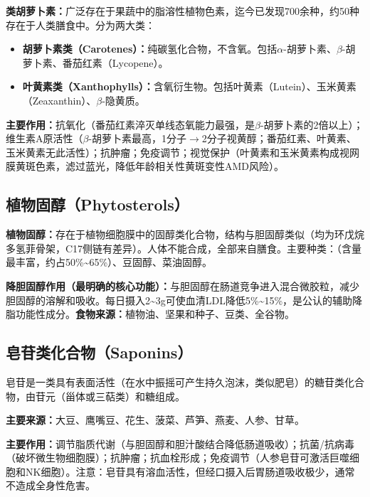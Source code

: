 \begin{tipbox}
\textbf{类胡萝卜素：}广泛存在于果蔬中的脂溶性植物色素，迄今已发现700余种，约50种存在于人类膳食中。分为两大类：
\begin{itemize}[leftmargin=*]
    \item \textbf{胡萝卜素类（Carotenes）：}纯碳氢化合物，不含氧。包括$\alpha$-胡萝卜素、$\beta$-胡萝卜素、番茄红素（Lycopene）。
    \item \textbf{叶黄素类（Xanthophylls）：}含氧衍生物。包括叶黄素（Lutein）、玉米黄素（Zeaxanthin）、$\beta$-隐黄质。
\end{itemize}

\textbf{主要作用：}抗氧化（番茄红素淬灭单线态氧能力最强，是$\beta$-胡萝卜素的2倍以上）；维生素A原活性（$\beta$-胡萝卜素最高，1分子$\rightarrow$2分子视黄醇；番茄红素、叶黄素、玉米黄素无此活性）；抗肿瘤；免疫调节；视觉保护（叶黄素和玉米黄素构成视网膜黄斑色素，滤过蓝光，降低年龄相关性黄斑变性AMD风险）。
\end{tipbox}

\subsection{植物固醇（Phytosterols）}

\begin{tipbox}
\textbf{植物固醇：}存在于植物细胞膜中的固醇类化合物，结构与胆固醇类似（均为环戊烷多氢菲骨架，C17侧链有差异）。人体不能合成，全部来自膳食。主要种类：（含量最丰富，约占50\%\~{}65\%）、豆固醇、菜油固醇。

\textbf{降胆固醇作用（最明确的核心功能）：}与胆固醇在肠道竞争进入混合微胶粒，减少胆固醇的溶解和吸收。每日摄入2\~{}3g可使血清LDL降低5\%\~{}15\%，是公认的辅助降脂功能性成分。\textbf{食物来源：}植物油、坚果和种子、豆类、全谷物。
\end{tipbox}

\subsection{皂苷类化合物（Saponins）}

皂苷是一类具有表面活性（在水中振摇可产生持久泡沫，类似肥皂）的糖苷类化合物，由苷元（甾体或三萜类）和糖组成。

\textbf{主要来源：}大豆、鹰嘴豆、花生、菠菜、芦笋、燕麦、人参、甘草。

\textbf{主要作用：}调节脂质代谢（与胆固醇和胆汁酸结合降低肠道吸收）；抗菌/抗病毒（破坏微生物细胞膜）；抗肿瘤；抗血栓形成；免疫调节（人参皂苷可激活巨噬细胞和NK细胞）。注意：皂苷具有溶血活性，但经口摄入后胃肠道吸收极少，通常不造成全身性危害。

